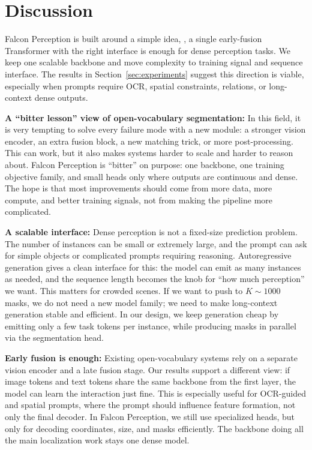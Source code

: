 \section{Discussion}
\label{sec:discussion}

Falcon Perception is built around a simple idea, \ie, a single early-fusion Transformer with the right interface is enough for dense perception tasks. We keep one scalable backbone and move complexity to training signal and sequence interface. The results in Section~\ref{sec:experiments} suggest this direction is viable, especially when prompts require OCR, spatial constraints, relations, or long-context dense outputs.

\noindent\textbf{A ``bitter lesson'' view of open-vocabulary segmentation:}
In this field, it is very tempting to solve every failure mode with a new module: a stronger vision encoder, an extra fusion block, a new matching trick, or more post-processing. This can work, but it also makes systems harder to scale and harder to reason about. Falcon Perception is ``bitter'' on purpose: one backbone, one training objective family, and small heads only where outputs are continuous and dense. The hope is that most improvements should come from more data, more compute, and better training signals, not from making the pipeline more complicated.

\noindent\textbf{A scalable interface:}
Dense perception is not a fixed-size prediction problem. The number of instances can be small or extremely large, and the prompt can ask for simple objects or complicated prompts requiring reasoning. Autoregressive generation gives a clean interface for this: the model can emit as many instances as needed, and the sequence length becomes the knob for ``how much perception'' we want. This matters for crowded scenes. If we want to push to $K\!\sim\!1000$ masks, we do not need a new model family; we need to make long-context generation stable and efficient. In our design, we keep generation cheap by emitting only a few task tokens per instance, while producing masks in parallel via the segmentation head.

\noindent\textbf{Early fusion is enough:}
Existing open-vocabulary systems  rely on a separate vision encoder and a late fusion stage. Our results support a different view: if image tokens and text tokens share the same backbone from the first layer, the model can learn the interaction just fine. This is especially useful for OCR-guided and spatial prompts, where the prompt should influence feature formation, not only the final decoder. In Falcon Perception, we still use specialized heads, but only for decoding coordinates, size, and masks efficiently. The backbone doing all the main localization work stays one dense model.

